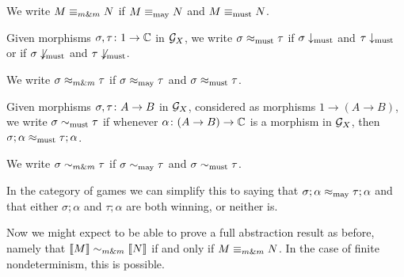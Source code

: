 \documentclass{article}
\begin{document}
We write $M\mathrel{\equiv_{m\&m}} N$ if $M\equiv_{\operatorname{may}} N$ and $M\equiv_{\operatorname{must}} N$.

\begin{definition}
  Given morphisms $\sigma,\tau \colon 1 \to \mathbb{C}$ in $\mathcal G_X$, we write $\sigma\approx_{\operatorname{must}}\tau$ if $\sigma\downarrow_{\operatorname{must}}$ and $\tau\downarrow_{\operatorname{must}}$ or if $\sigma\not\downarrow_{\operatorname{must}}$ and $\tau\not\downarrow_{\operatorname{must}}$.  
\end{definition}

We write $\sigma\mathrel{\approx_{m\&m}} \tau$ if $\sigma\approx_{\operatorname{may}}\tau$ and $\sigma\approx_{\operatorname{must}}\tau$.

\begin{definition}
  Given morphisms $\sigma,\tau\colon A \to B$ in $\mathcal G_X$, considered as morphisms $1 \to (A \to B)$, we write $\sigma\sim_{\operatorname{must}}\tau$ if whenever $\alpha\colon (A \to B) \to \mathbb{C}$ is a morphism in $\mathcal G_X$, then $\sigma;\alpha\approx_{\operatorname{must}}\tau;\alpha$.
\end{definition}

We write $\sigma\mathrel{\sim_{m\&m}} \tau$ if $\sigma\sim_{\operatorname{may}}\tau$ and $\sigma\sim_{\operatorname{must}} \tau$.

\begin{remark}
  In the category of games we can simplify this to saying that $\sigma;\alpha\approx_{\operatorname{may}}\tau;\alpha$ and that either $\sigma;\alpha$ and $\tau;\alpha$ are both winning, or neither is.
\end{remark}

Now we might expect to be able to prove a full abstraction result as before, namely that $\left\llbracket M\right\rrbracket\mathrel{\sim_{m\&m}} \left\llbracket N\right\rrbracket$ if and only if $M\mathrel{\equiv_{m\&m}} N$.  
In the case of finite nondeterminism, this is possible.
\end{document}
